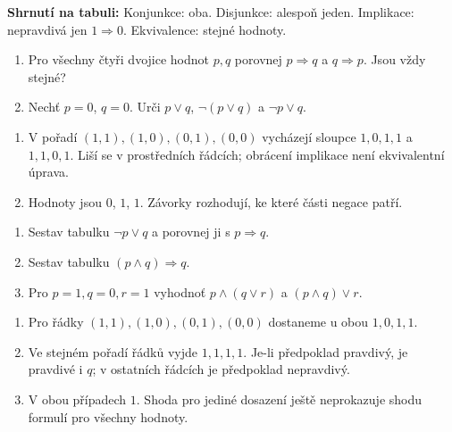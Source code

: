 \documentclass[11pt,a4paper]{article}
\begin{document}
\textbf{Shrnutí na tabuli:} Konjunkce: oba. Disjunkce: alespoň jeden. Implikace: nepravdivá jen $1\Rightarrow0$. Ekvivalence: stejné hodnoty.




\begin{zadaniReseniBox}[title={Rozšíření 1},breakable=false]
\begin{enumerate}[label=\alph*)]
\item Pro všechny čtyři dvojice hodnot $p,q$ porovnej $p\Rightarrow q$ a $q\Rightarrow p$. Jsou vždy stejné?
\item Nechť $p=0$, $q=0$. Urči $p\lor q$, $\neg(p\lor q)$ a $\neg p\lor q$.
\end{enumerate}
\tcblower
\begin{enumerate}[label=\alph*)]
\item V pořadí $(1,1),(1,0),(0,1),(0,0)$ vycházejí sloupce $1,0,1,1$ a $1,1,0,1$. Liší se v prostředních řádcích; obrácení implikace není ekvivalentní úprava.
\item Hodnoty jsou $0$, $1$, $1$. Závorky rozhodují, ke které části negace patří.
\end{enumerate}
\end{zadaniReseniBox}




\begin{zadaniReseniBox}[title={Domácí úkol},breakable=false]
\begin{enumerate}[label=\alph*)]
\item Sestav tabulku $\neg p\lor q$ a porovnej ji s $p\Rightarrow q$.
\item Sestav tabulku $(p\land q)\Rightarrow q$.
\item Pro $p=1,q=0,r=1$ vyhodnoť $p\land(q\lor r)$ a $(p\land q)\lor r$.
\end{enumerate}
\tcblower
\begin{enumerate}[label=\alph*)]
\item Pro řádky $(1,1),(1,0),(0,1),(0,0)$ dostaneme u obou $1,0,1,1$.
\item Ve stejném pořadí řádků vyjde $1,1,1,1$. Je-li předpoklad pravdivý, je pravdivé i $q$; v ostatních řádcích je předpoklad nepravdivý.
\item V obou případech $1$. Shoda pro jediné dosazení ještě neprokazuje shodu formulí pro všechny hodnoty.
\end{enumerate}
\end{zadaniReseniBox}
\end{document}
